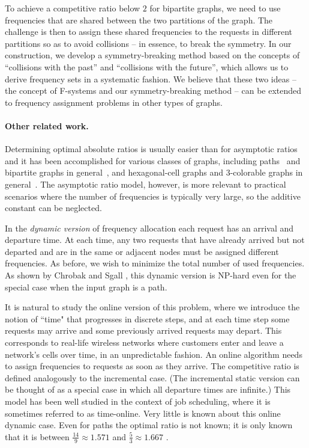 \documentclass[11pt]{article}
\newcommand{\fivethirds}{{\mbox{$\frac{5}{3}$}}}
\newcommand{\fourteennineth}{{\mbox{$\frac{14}{9}$}}}
\newcommand{\NP}{{\textsf{NP}}}
\begin{document}
To achieve a competitive ratio below $2$ for bipartite graphs, we need to use
frequencies that are shared between the two partitions of the graph. The
challenge is then to assign these shared frequencies to the requests in
different partitions so as to avoid collisions -- in essence, to break
the symmetry. In our construction, we develop a symmetry-breaking method
based on the concepts of ``collisions with the past'' and ``collisions with the
future'', which allows us to derive frequency sets in a systematic fashion.
We believe that these two ideas -- the concept of
F-systems and our symmetry-breaking method -- can be extended to frequency
assignment problems in other types of graphs.



\paragraph{Other related work.}
Determining optimal absolute ratios
is usually easier than for asymptotic ratios and it has been accomplished for
various classes of graphs, including paths~\cite{ChCYZZ06} and bipartite graphs
in general~\cite{ChChYZ07,ChChYZ10}, and hexagonal-cell graphs and $3$-colorable
graphs in general~\cite{ChChYZ07,ChChYZ10}.
The asymptotic ratio model, however, is more relevant to practical scenarios where the
number of frequencies is typically very large, so the additive constant
can be neglected.

In the \emph{dynamic version} of frequency allocation each request
has an arrival and departure time. At each time, any two requests
that have already arrived but not departed and are in the same
or adjacent nodes must be assigned different frequencies. As before,
we wish to minimize the total number of used frequencies.
As shown by Chrobak and Sgall \cite{ChrSga10}, this dynamic
version is {\NP}-hard even for the special case when the input graph is a path. 

It is natural to study the online version of this problem, where
we introduce the notion of ``time" that progresses in discrete steps, and
at each time step some requests may arrive and some previously arrived
requests may depart. This corresponds to real-life wireless networks where
customers enter and leave a network's cells over time, in an unpredictable
fashion. An online algorithm needs to assign frequencies to requests as 
soon as they arrive. The competitive ratio is defined 
analogously to the incremental case. (The incremental static
version can be thought of as
a special case in which all departure times are infinite.)
This model has been well studied in the context of job scheduling, where it is sometimes
referred to as time-online. Very little is known about this online dynamic
case. Even for paths the optimal ratio is not known; it is only known
that it is between $\fourteennineth\approx 1.571$ \cite{ChrSga10}
and $\fivethirds\approx 1.667$ \cite{ChCYZZ06}.
\end{document}
